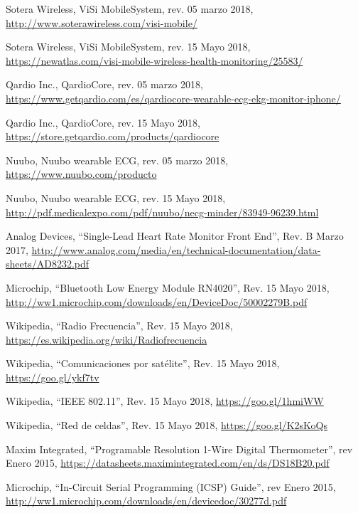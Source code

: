 \renewcommand{\refname}{Referencias}
\begin{thebibliography}{99}

 Sotera Wireless, ViSi Mobile\textregistered  System, rev. 05 marzo 2018, \hyperref[visi]{http://www.soterawireless.com/visi-mobile/}

 Sotera Wireless, ViSi Mobile\textregistered  System, rev. 15 Mayo 2018, \hyperref[visi_tel]{https://newatlas.com/visi-mobile-wireless-health-monitoring/25583/}

 Qardio Inc., QardioCore, rev.  05 marzo 2018, \hyperref[qardio]{https://www.getqardio.com/es/qardiocore-wearable-ecg-ekg-monitor-iphone/}

 Qardio Inc., QardioCore, rev.  15 Mayo 2018,
\hyperref[qardio_tel]{https://store.getqardio.com/products/qardiocore}

 Nuubo, Nuubo wearable ECG, rev. 05 marzo 2018, \hyperref[nuubo]{https://www.nuubo.com/producto}

 Nuubo, Nuubo wearable ECG, rev. 15 Mayo 2018, \hyperref[nuubo_tel]{http://pdf.medicalexpo.com/pdf/nuubo/necg-minder/83949-96239.html}

 Analog Devices, ``Single-Lead Heart Rate Monitor Front End'', Rev. B Marzo 2017, \hyperref[ad8232]{http://www.analog.com/media/en/technical-documentation/data-sheets/AD8232.pdf}

 Microchip, ``Bluetooth Low Energy Module RN4020'', Rev. 15 Mayo 2018, \hyperref[RN4020]{http://ww1.microchip.com/downloads/en/DeviceDoc/50002279B.pdf}

 Wikipedia, ``Radio Frecuencia'', Rev. 15 Mayo 2018, \hyperref[RF]{https://es.wikipedia.org/wiki/Radiofrecuencia}

 Wikipedia, ``Comunicaciones por satélite'', Rev. 15 Mayo 2018, \hyperref[satelite]{https://goo.gl/ykf7tv}

 Wikipedia, ``IEEE 802.11'', Rev. 15 Mayo 2018, \hyperref[wifi]{https://goo.gl/1hmiWW}

 Wikipedia, ``Red de celdas'', Rev. 15 Mayo 2018, \hyperref[celular]{https://goo.gl/K2sKoQs}

 Maxim Integrated, ``Programable Resolution 1-Wire Digital Thermometer'', rev Enero 2015, \hyperref[temp]{https://datasheets.maximintegrated.com/en/ds/DS18B20.pdf}

 Microchip, ``In-Circuit Serial Programming (ICSP) Guide'', rev Enero 2015, \hyperref[temp]{http://ww1.microchip.com/downloads/en/devicedoc/30277d.pdf}


\end{thebibliography}
